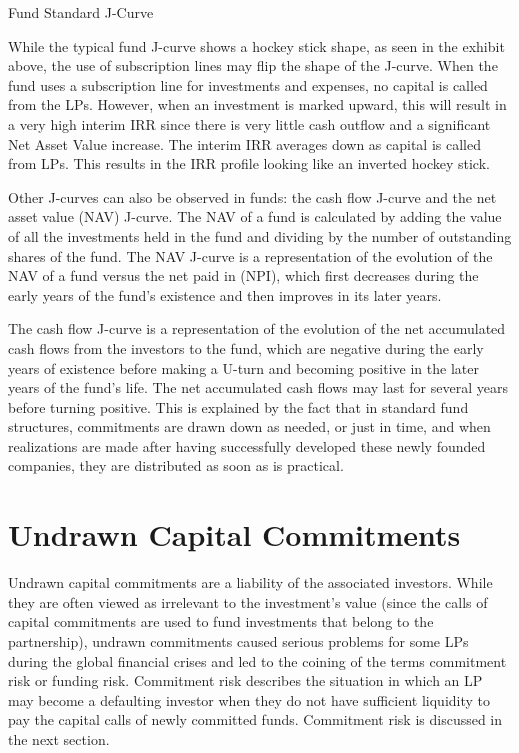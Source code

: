 \documentclass[11pt]{article}
\begin{document}
Fund Standard J-Curve

While the typical fund J-curve shows a hockey stick shape, as seen in the exhibit above, the use of subscription lines may flip the shape of the J-curve. When the fund uses a subscription line for investments and expenses, no capital is called from the LPs. However, when an investment is marked upward, this will result in a very high interim IRR since there is very little cash outflow and a significant Net Asset Value increase. The interim IRR averages down as capital is called from LPs. This results in the IRR profile looking like an inverted hockey stick.

Other J-curves can also be observed in funds: the cash flow J-curve and the net asset value (NAV) J-curve. The NAV of a fund is calculated by adding the value of all the investments held in the fund and dividing by the number of outstanding shares of the fund. The NAV J-curve is a representation of the evolution of the NAV of a fund versus the net paid in (NPI), which first decreases during the early years of the fund's existence and then improves in its later years.

The cash flow J-curve is a representation of the evolution of the net accumulated cash flows from the investors to the fund, which are negative during the early years of existence before making a U-turn and becoming positive in the later years of the fund's life. The net accumulated cash flows may last for several years before turning positive. This is explained by the fact that in standard fund structures, commitments are drawn down as needed, or just in time, and when realizations are made after having successfully developed these newly founded companies, they are distributed as soon as is practical.

\section*{Undrawn Capital Commitments}
Undrawn capital commitments are a liability of the associated investors. While they are often viewed as irrelevant to the investment's value (since the calls of capital commitments are used to fund investments that belong to the partnership), undrawn commitments caused serious problems for some LPs during the global financial crises and led to the coining of the terms commitment risk or funding risk. Commitment risk describes the situation in which an LP may become a defaulting investor when they do not have sufficient liquidity to pay the capital calls of newly committed funds. Commitment risk is discussed in the next section.
\end{document}
